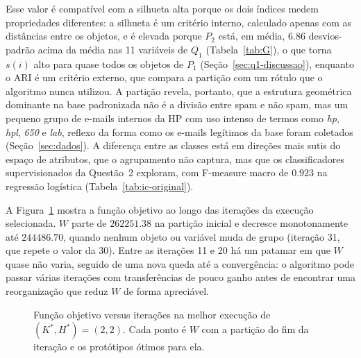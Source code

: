 \documentclass[11pt,a4paper]{article}
\begin{document}
Esse valor é compatível com a silhueta alta porque os dois índices medem propriedades diferentes: a silhueta é um critério interno, calculado apenas 
com as distâncias entre os objetos, e é elevada porque $P_2$ está, em média, $\num{6.86}$ desvios-padrão acima da média nas 11 variáveis de $Q_1$
(Tabela~\ref{tab:G}), o que torna $s(i)$ alto para quase todos os objetos de $P_1$ (Seção~\ref{sec:q1-discussao}), enquanto o ARI é um critério externo, 
que compara a partição com um rótulo que o algoritmo nunca utilizou. A partição revela, portanto, que a estrutura geométrica dominante na base 
padronizada não é a divisão entre spam e não spam, mas um pequeno grupo de e-mails internos da HP com uso intenso de termos como \textit{hp}, 
\textit{hpl}, \textit{650} e \textit{lab}, reflexo da forma como os e-mails legítimos da base foram coletados (Seção~\ref{sec:dados}). A diferença entre 
as classes está em direções mais sutis do espaço de atributos, que o agrupamento não captura, mas que os classificadores supervisionados da Questão~2 
exploram, com F-measure macro de $\num{0.923}$ na regressão logística (Tabela~\ref{tab:ic-original}).

A Figura~\ref{fig:convergencia} mostra a função objetivo ao longo das iterações da execução selecionada. $W$ parte
de $\num{262251.38}$ na partição inicial e decresce monotonamente até $\num{244486.70}$, quando nenhum objeto ou
variável muda de grupo (iteração 31, que repete o valor da 30). Entre as iterações 11 e 20 há um patamar em que
$W$ quase não varia, seguido de uma nova queda até a convergência: o algoritmo pode passar várias iterações com
transferências de pouco ganho antes de encontrar uma reorganização que reduz $W$ de forma apreciável.

\begin{figure}[H]
\centering
{}
\caption{Função objetivo versus iterações na melhor execução de $(K^*,H^*)=(2,2)$. Cada ponto é $W$ com a
partição do fim da iteração e os protótipos ótimos para ela.}\label{fig:convergencia}
\end{figure}
\end{document}
